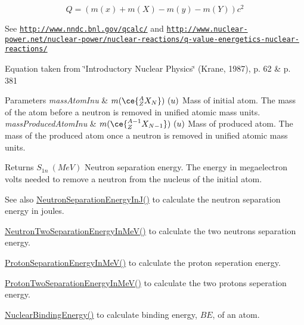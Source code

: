 \[Q = \left ( m(x) + m (X) - m(y) - m(Y) \right ) c^2\]

See \href{http://www.nndc.bnl.gov/qcalc/}{\tt http\+://www.\+nndc.\+bnl.\+gov/qcalc/} and \href{http://www.nuclear-power.net/nuclear-power/nuclear-reactions/q-value-energetics-nuclear-reactions/}{\tt http\+://www.\+nuclear-\/power.\+net/nuclear-\/power/nuclear-\/reactions/q-\/value-\/energetics-\/nuclear-\/reactions/}

Equation taken from \char`\"{}\+Introductory Nuclear Physics\char`\"{} (Krane, 1987), p. 62 \& p. 381


\begin{DoxyParams}{Parameters}
{\em mass\+Atom\+Inu} & $m(\ce{ ^{A}_{Z}X_{N} })\ (u)$ Mass of initial atom. The mass of the atom before a neutron is removed in unified atomic mass units. \\
\hline
{\em mass\+Produced\+Atom\+Inu} & $m(\ce{ ^{A-1}_{Z}X_{N-1} })\ (u)$ Mass of produced atom. The mass of the produced atom once a neutron is removed in unified atomic mass units. \\
\hline
\end{DoxyParams}
\begin{DoxyReturn}{Returns}
$S_{1n}\ (MeV)$ Neutron separation energy. The energy in megaelectron volts needed to remove a neutron from the nucleus of the initial atom. 
\end{DoxyReturn}
\begin{DoxySeeAlso}{See also}
\mbox{\hyperlink{group___nuclear_separation_energy_ga14a4bb972ae000ef4ff35f2734ff22d0}{Neutron\+Separation\+Energy\+In\+J()}} to calculate the neutron separation energy in joules. 

\mbox{\hyperlink{group___nuclear_separation_energy_ga09985fc876eb632695bfbc1f2f325401}{Neutron\+Two\+Separation\+Energy\+In\+Me\+V()}} to calculate the two neutrons separation energy. 

\mbox{\hyperlink{group___nuclear_separation_energy_ga6a619ded55c47ed22ea2d8a85202ebeb}{Proton\+Separation\+Energy\+In\+Me\+V()}} to calculate the proton seperation energy. 

\mbox{\hyperlink{group___nuclear_separation_energy_ga0de42783a7c650eb32f85dc2d40d84d7}{Proton\+Two\+Separation\+Energy\+In\+Me\+V()}} to calculate the two protons seperation energy. 

\mbox{\hyperlink{group___nuclear_binding_energy_gafea41a3c21704414394c3204b35aba98}{Nuclear\+Binding\+Energy()}} to calculate binding energy, $BE$, of an atom. 
\end{DoxySeeAlso}
